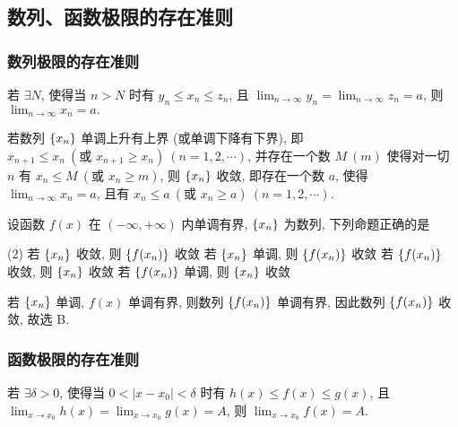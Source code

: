 \subsection{数列、函数极限的存在准则}

\subsubsection{数列极限的存在准则}

\begin{theorem}[数列的夹逼准则]
    \label{pinchGuidelines}
    若 $\exists N$, 使得当 $n>N$ 时有 $y_n\leqslant x_n\leqslant z_n$, 且 $\displaystyle\lim_{n\to\infty}y_n=\lim_{n\to\infty}z_n=a$, 则 $\displaystyle\lim_{n\to\infty}x_n=a.$
\end{theorem}

\begin{theorem}[数列的单调有界准则]
    若数列 $\qty{x_n}$ 单调上升有上界 (或单调下降有下界), 即 $x_{n+1}\leqslant x_n~(\text{或 }x_{n+1}\geqslant x_n)~(n=1,2,\cdots)$, 并存在一个数 $M~ (m)$ 使得对一切 $n$ 有 $x_n\leqslant M~(\text{或 }x_n\geqslant m)$, 则 $\qty{x_n}$ 收敛, 即存在一个数 $a$, 使得 $\displaystyle\lim_{n\to\infty}x_n=a$, 且有 $x_n\leqslant a~(\text{或 }x_n\geqslant a)~(n=1,2,\cdots)$.
\end{theorem}

\begin{example}[2008 数一]
    设函数 $f(x)$ 在 $(-\infty,+\infty)$ 内单调有界, $\qty{x_n}$ 为数列, 下列命题正确的是 
    \begin{tasks}(2)
        \task 若 $\qty{x_n}$ 收敛, 则 $\qty{f(x_n)}$ 收敛
        \task 若 $\qty{x_n}$ 单调, 则 $\qty{f(x_n)}$ 收敛
        \task 若 $\qty{f(x_n)}$ 收敛, 则 $\qty{x_n}$ 收敛
        \task 若 $\qty{f(x_n)}$ 单调, 则 $\qty{x_n}$ 收敛
    \end{tasks}
\end{example}
\begin{solution}
    若 $\qty{x_n}$ 单调, $f(x)$ 单调有界, 则数列 $\qty{f(x_n)}$ 单调有界, 因此数列 $\qty{f(x_n)}$ 收敛, 故选 B.
\end{solution}

\subsubsection{函数极限的存在准则}

\begin{theorem}[函数的夹逼准则]
    若 $\exists\delta>0$, 使得当 $0<|x-x_0|<\delta$ 时有 $h(x)\leqslant f(x)\leqslant g(x)$, 且 $\displaystyle \lim_{x \to x_0}h(x)=\lim_{x \to x_0}g(x)=A$, 则 $\displaystyle \lim_{x \to x_0}f(x)=A.$
\end{theorem}

